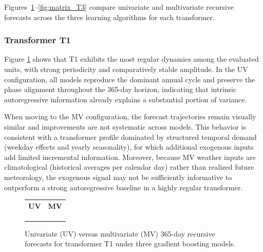 Figures~\ref{fig:matrix_T1}--\ref{fig:matrix_T3} compare univariate and multivariate recursive forecasts across the three learning algorithms for each transformer.

\subsubsection{Transformer T1}
Figure \ref{fig:matrix_T1} shows that T1 exhibits the most regular dynamics among the evaluated units, with strong periodicity and comparatively stable amplitude. In the UV configuration, all models reproduce the dominant annual cycle and preserve the phase alignment throughout the 365-day horizon, indicating that intrinsic autoregressive information already explains a substantial portion of variance. 

When moving to the MV configuration, the forecast trajectories remain visually similar and improvements are not systematic across models. This behavior is consistent with a transformer profile dominated by structured temporal demand (weekday effects and yearly seasonality), for which additional exogenous inputs add limited incremental information. Moreover, because MV weather inputs are climatological (historical averages per calendar day) rather than realized future meteorology, the exogenous signal may not be sufficiently informative to outperform a strong autoregressive baseline in a highly regular transformer.

\begin{figure}[!h]
\centering
\setlength{\tabcolsep}{3pt}
\renewcommand{\arraystretch}{1.0}
\begin{tabular}{cc}
\textbf{UV} & \textbf{MV} \\
 &
 \\
 &
 \\
 &
 \\
\end{tabular}
\caption{Univariate (UV) versus multivariate (MV) 365-day recursive forecasts for transformer T1 under three gradient boosting models.}
\label{fig:matrix_T1}
\end{figure}


